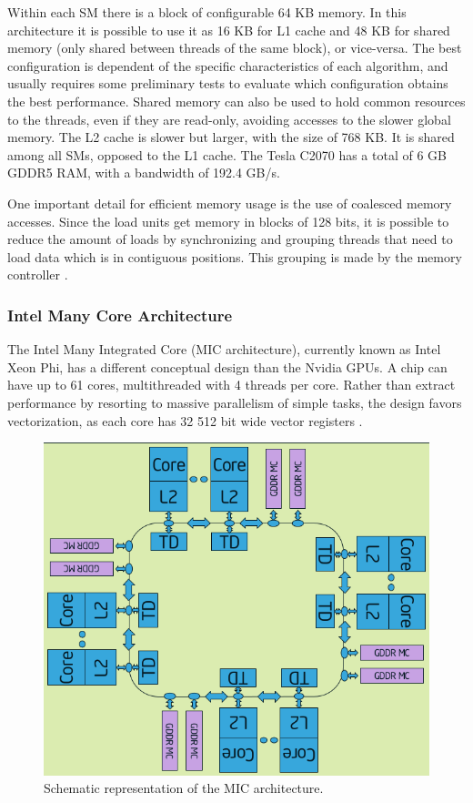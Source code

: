 Within each SM there is a block of configurable 64 KB memory. In this architecture it is possible to use it as 16 KB for L1 cache and 48 KB for shared memory (only shared between threads of the same block), or vice-versa. The best configuration is dependent of the specific characteristics of each algorithm, and usually requires some preliminary tests to evaluate which configuration obtains the best performance. Shared memory can also be used to hold common resources to the threads, even if they are read-only, avoiding accesses to the slower global memory. The L2 cache is slower but larger, with the size of 768 KB. It is shared among all SMs, opposed to the L1 cache. The Tesla C2070 has a total of 6 GB GDDR5 RAM, with a bandwidth of 192.4 GB/s.

One important detail for efficient memory usage is the use of coalesced memory accesses. Since the load units get memory in blocks of 128 bits, it is possible to reduce the amount of loads by synchronizing and grouping threads that need to load data which is in contiguous positions. This grouping is made by the memory controller .

\subsubsection*{Intel Many Core Architecture}
\label{MIC}

The Intel Many Integrated Core (MIC architecture), currently known as Intel Xeon Phi, has a different conceptual design than the Nvidia GPUs. A chip can have up to 61 cores, multithreaded with 4 threads per core. Rather than extract performance by resorting to massive parallelism of simple tasks, the design favors vectorization, as each core has 32 512 bit wide vector registers \cite{Intel:MIC}.

\begin{figure}[!htp]
	\begin{center}
		\includegraphics[scale=0.3]{../../common/img/mic_arch.png}
		\caption{Schematic representation of the \intel MIC architecture.}
		\label{fig:MICArchitecture}
	\end{center}
\end{figure}

